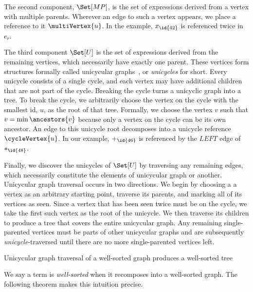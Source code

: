 The second component, $\Set[MP]$, is the set of expressions derived from a vertex with multiple parents. Wherever an edge to such a vertex appears, we place a reference to it $\multiVertex{u}$.
In the example, $x_{\id{42}}$ is referenced twice in $e_r$.

The third component $\Set[U]$ is the set of expressions derived from the remaining vertices, which necessarily have exactly one parent.
These vertices form structures formally called unicycular graphs~\citep{DBLP:journals/algorithmica/KruskalRS90}, or \emph{unicycles} for short.
Every unicycle consists of a single cycle, and each vertex may have additional children that are not part of the cycle. Breaking the cycle turns a unicyclic graph into a tree.
To break the cycle, we arbitrarily choose the vertex on the cycle with the smallest id, $u$, as the root of that tree.
Formally, we choose the vertex $v$ such that $v = \min{\ancestors{v}}$ because
only a vertex on the cycle can be its own ancestor.
An edge to this unicycle root decomposes into a unicycle reference $\cycleVertex{u}$.
In our example, ${+}_{\id{46}}$ is referenced by the $LEFT$ edge of ${*}_{\id{48}}$.

Finally, we discover the unicycles of $\Set[U]$ by traversing any remaining edges, which necessarily constitute the elements of unicycular graph or another. Unicycular graph traversal occurs in two directions. We begin by choosing a a vertex as an arbitrary starting point, traverse its parents, and marking all of its vertices as seen. Since a vertex that has been seen twice must be on the cycle, we take the first such vertex as the root of the unicycle. We then traverse its children to produce a tree that covers the entire unicycular graph. Any remaining single-parented vertices must be parts of other unicycular graphs and are subsequently \emph{unicycle}-traversed until there are no more single-parented vertices left.


\begin{lemma}
    Unicycular graph traversal of a well-sorted graph produces a well-sorted tree
\end{lemma}

We say a term is \emph{well-sorted} when it recomposes into a well-sorted graph. The following theorem makes this intuition precise.

